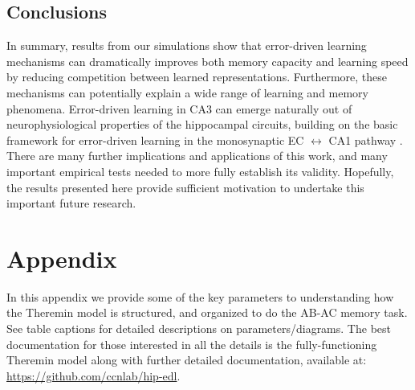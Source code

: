 \documentclass[11pt,twoside]{article}
\newif\myifpdf
\begin{document}
\subsection{Conclusions}

In summary, results from our simulations show that error-driven learning mechanisms can dramatically improves both memory capacity and learning speed by reducing competition between learned representations.  Furthermore, these mechanisms can potentially explain a wide range of learning and memory phenomena.  Error-driven learning in CA3 can emerge naturally out of neurophysiological properties of the hippocampal circuits, building on the basic framework for error-driven learning in the monosynaptic EC $\leftrightarrow$ CA1 pathway \citep{KetzMorkondaOReilly13}.  There are many further implications and applications of this work, and many important empirical tests needed to more fully establish its validity.  Hopefully, the results presented here provide sufficient motivation to undertake this important future research.


\section{Appendix}

In this appendix we provide some of the key parameters to understanding how the Theremin model is structured, and organized to do the AB-AC memory task.  See table captions for detailed descriptions on parameters/diagrams.  The best documentation for those interested in all the details is the fully-functioning Theremin model along with further detailed documentation, available at: \url{https://github.com/ccnlab/hip-edl}.   
\end{document}
